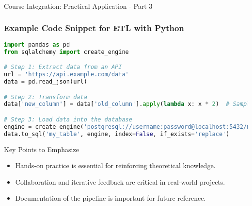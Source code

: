 \documentclass[aspectratio=169]{beamer}
\begin{document}
\begin{frame}[fragile]{Course Integration: Practical Application - Part 3}
    \frametitle{Example Code Snippet for ETL with Python}

    \begin{lstlisting}[language=Python]
import pandas as pd
from sqlalchemy import create_engine

# Step 1: Extract data from an API
url = 'https://api.example.com/data'
data = pd.read_json(url)

# Step 2: Transform data
data['new_column'] = data['old_column'].apply(lambda x: x * 2)  # Sample transformation

# Step 3: Load data into the database
engine = create_engine('postgresql://username:password@localhost:5432/mydatabase')
data.to_sql('my_table', engine, index=False, if_exists='replace')
    \end{lstlisting}

    \begin{block}{Key Points to Emphasize}
        \begin{itemize}
            \item Hands-on practice is essential for reinforcing theoretical knowledge.
            \item Collaboration and iterative feedback are critical in real-world projects.
            \item Documentation of the pipeline is important for future reference.
        \end{itemize}
    \end{block}
\end{frame}
\end{document}

